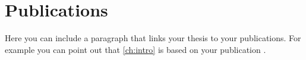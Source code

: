 \chapter*{Publications}

Here you can include a paragraph that links your thesis to your publications. For example you can point out that \autoref{ch:intro} is based on your publication \cite{gauss}.